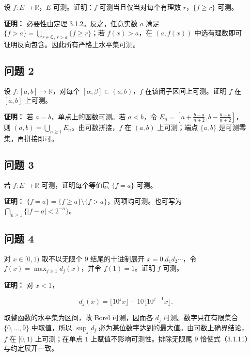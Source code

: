 \documentclass[11pt,a4paper]{article}
\begin{document}
设 \(f:E\to\mathbb R\)，\(E\) 可测。证明：\(f\) 可测当且仅当对每个有理数
\(r\)，\(\{f\ge r\}\) 可测。

\textbf{证明：} 必要性由定理 3.1.2。反之，任意实数 \(a\) 满足
\(\{f>a\}=\bigcup_{r\in\mathbb Q,\,r>a}\{f\ge r\}\)；若 \(f(x)>a\)，在
\((a,f(x))\) 中选有理数即可证明反向包含。因此所有严格上水平集可测。

\subsection{问题 2}\label{ux95eeux9898-2}

设 \(f:[a,b]\to\mathbb R\)，对每个 \([\alpha,\beta]\subset(a,b)\)，\(f\)
在该闭子区间上可测。证明 \(f\) 在 \([a,b]\) 上可测。

\textbf{证明：} 若 \(a=b\)，单点上的函数可测。若 \(a<b\)，令
\(E_n=[a+\frac{b-a}{n+2},b-\frac{b-a}{n+2}]\)，则
\((a,b)=\bigcup_{n\ge1}E_n\)。由可数拼接，\(f\) 在 \((a,b)\)
上可测；端点 \(\{a,b\}\) 是可测零集，再拼接即可。

\subsection{问题 3}\label{ux95eeux9898-3}

若 \(f:E\to\mathbb R\) 可测，证明每个等值层 \(\{f=a\}\) 可测。

\textbf{证明：}
\(\{f=a\}=\{f\ge a\}\setminus\{f>a\}\)，两项均可测。也可写为
\(\bigcap_{n\ge1}\{|f-a|<2^{-n}\}\)。

\subsection{问题 4}\label{ux95eeux9898-4}

对 \(x\in[0,1)\) 取不以无限个 \(9\) 结尾的十进制展开
\(x=0.d_1d_2\cdots\)，令 \(f(x)=\max_{j\ge1}d_j(x)\)，并令
\(f(1)=1\)。证明 \(f\) 可测。

\textbf{证明：} 对 \(x<1\)，

\begin{equation*}
d_j(x)=\lfloor10^jx\rfloor-10\lfloor10^{j-1}x\rfloor.
\tag{3.1.11}
\end{equation*}

取整函数的水平集为区间，故 Borel 可测，因而各 \(d_j\)
可测。数字只在有限集合 \(\{0,\ldots,9\}\) 中取值，所以 \(\sup_jd_j\)
必为某位数字达到的最大值。由可数上确界结论，\(f\) 在 \([0,1)\)
上可测；在单点 \(1\) 上赋值不影响可测性。排除无限尾 \(9\)
恰使式（3.1.11）与约定展开一致。
\end{document}
